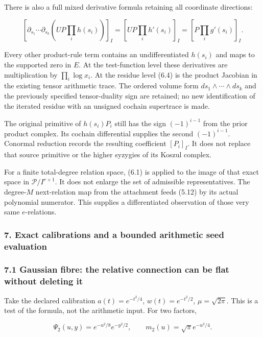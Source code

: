 There is also a full mixed derivative formula retaining all coordinate
directions:

\[\boxed{\left[\partial_{s_1}\cdots\partial_{s_k}
\left(UP\prod_i h(s_i)\right)\right]_I
=\left[U P\prod_i h'(s_i)\right]_I
=\left[P\prod_i g'(s_i)\right]_I.}\tag{6.4}\]

Every other product-rule term contains an undifferentiated \(h(s_i)\)
and maps to the supported zero in \(E\). At the test-function level
these derivatives are multiplication by \(\prod_i\log x_i\). At the
residue level (6.4) is the product Jacobian in the existing tensor
arithmetic trace. The ordered volume form
\(ds_1\wedge\cdots\wedge ds_k\) and the previously specified
tensor-duality sign are retained; no new identification of the iterated
residue with an unsigned cochain supertrace is made.

The original primitive of \(h(s_i)P_i\) still has the sign
\((-1)^{i-1}\) from the prior product complex. Its cochain differential
supplies the second \((-1)^{i-1}\). Conormal reduction records the
resulting coefficient \([P_i]_I\). It does not replace that source
primitive or the higher syzygies of its Koszul complex.

For a finite total-degree relation space, (6.1) is applied to the image
of that exact space in \(\mathcal P/I^{r+1}\). It does not enlarge the
set of admissible representatives. The degree-\(M\) next-relation map
from the attachment feeds (5.12) by its actual polynomial numerator.
This supplies a differentiated observation of those very same
\(e\)-relations.

\subsubsection{7. Exact calibrations and a bounded arithmetic seed
evaluation}\label{sum_connection:exact-calibrations-and-a-bounded-arithmetic-seed-evaluation}

\subsubsection{7.1 Gaussian fibre: the relative connection can be flat
without deleting
it}\label{sum_connection:gaussian-fibre-the-relative-connection-can-be-flat-without-deleting-it}

Take the declared calibration \(a(t)=e^{-t^2/4}\), \(w(t)=e^{-t^2/2}\),
\(\mu=\sqrt{2\pi}\). This is a test of the formula, not the arithmetic
input. For two factors,

\[\Psi_2(u,y)=e^{-u^2/8}e^{-y^2/2},\qquad m_2(u)=\sqrt\pi e^{-u^2/4}.\]

